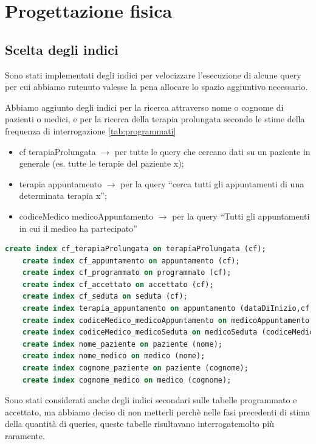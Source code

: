 \documentclass[11pt]{article}
\begin{document}
\section{Progettazione fisica}
\subsection{Scelta degli indici}
Sono stati implementati degli indici per velocizzare l'esecuzione di alcune query per cui abbiamo rutenuto valesse la pena allocare lo spazio aggiuntivo necessario.

Abbiamo aggiunto degli indici per la ricerca attraverso nome o cognome di pazienti o medici, e per la ricerca della terapia prolungata secondo le stime della frequenza di interrogazione \ref{tab:programmati}

\begin{itemize}
    \item cf terapiaProlungata $\rightarrow$ per tutte le query che cercano dati su un paziente in generale (es. tutte le terapie del paziente x);
    \item terapia appuntamento $\rightarrow$ per la query ``cerca tutti gli appuntamenti di una determinata terapia x'';
    \item codiceMedico medicoAppuntamento $\rightarrow$ per la query ``Tutti gli appuntamenti in cui il medico ha partecipato''
\end{itemize}
\begin{lstlisting}[language=SQL]
    create index cf_terapiaProlungata on terapiaProlungata (cf);
    create index cf_appuntamento on appuntamento (cf);
    create index cf_programmato on programmato (cf);
    create index cf_accettato on accettato (cf);
    create index cf_seduta on seduta (cf);
    create index terapia_appuntamento on appuntamento (dataDiInizio,cf,tipoDiSpecializzazione);
    create index codiceMedico_medicoAppuntamento on medicoAppuntamento (codiceMedico);
    create index codiceMedico_medicoSeduta on medicoSeduta (codiceMedico);
    create index nome_paziente on paziente (nome);
    create index nome_medico on medico (nome);
    create index cognome_paziente on paziente (cognome);
    create index cognome_medico on medico (cognome);
\end{lstlisting}
Sono stati considerati anche degli indici secondari sulle tabelle programmato e accettato, ma abbiamo deciso di non metterli perchè nelle fasi precedenti di stima della quantità di queries, queste tabelle risultavano interrogatemolto più raramente.
\end{document}
